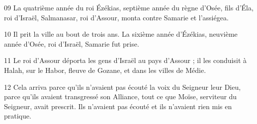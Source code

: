 
09 La quatrième année du roi Ézékias, septième année du règne d’Osée, fils d’Éla, roi d’Israël, Salmanasar, roi d’Assour, monta contre Samarie et l’assiégea.

10 Il prit la ville au bout de trois ans. La sixième année d’Ézékias, neuvième année d’Osée, roi d’Israël, Samarie fut prise.

11 Le roi d’Assour déporta les gens d’Israël au pays d’Assour ; il les conduisit à Halah, sur le Habor, fleuve de Gozane, et dans les villes de Médie.

12 Cela arriva parce qu’ils n’avaient pas écouté la voix du Seigneur leur Dieu, parce qu’ils avaient transgressé son Alliance, tout ce que Moïse, serviteur du Seigneur, avait prescrit. Ils n’avaient pas écouté et ils n’avaient rien mis en pratique.
